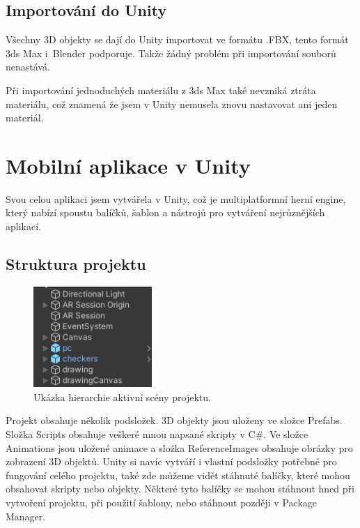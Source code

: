 \documentclass[12pt, a4paper,
twoside,        %
openright
]{report}
\let\oldchapter\chapter
\renewcommand{\chapter}{
	\clearpage
	\pagestyle{fancy}
	\oldchapter
}
\begin{document}
\section {Importování do Unity}
\label{import_do_unity}
Všechny 3D objekty se dají do Unity importovat ve formátu .FBX, tento formát 3ds Max i~Blender podporuje. Takže žádný problém při importování souborů nenastává.

Při importování jednoduchých materiálu z 3ds Max také nevzniká ztráta materiálu, což znamená že jsem v Unity nemusela znovu nastavovat ani jeden materiál. 






\chapter{Mobilní aplikace v Unity}	

Svou celou aplikaci jsem vytvářela v Unity, což je multiplatformní herní engine, který nabízí spoustu balíčků, šablon a nástrojů pro vytváření nejrůznějších aplikací.  

	\section{Struktura projektu}
\label{sec:struktura_projektu}

		\begin{figure}[h!]
	\centering 
	\includegraphics[width=0.4\textwidth]{image/hierarchy.jpg} 
	\caption{Ukázka hierarchie aktivní scény projektu.} 
	\label{fig:hierarchie} 
\end{figure}


	Projekt obsahuje několik podsložek. 
	3D objekty jsou uloženy ve složce Prefabs. Složka Scripts obsahuje veškeré mnou napsané skripty v C\#. Ve složce Animations jsou uložené animace a složka ReferenceImages obsahuje obrázky pro zobrazení 3D objektů. Unity si navíc vytváří i vlastní podsložky potřebné pro fungování celého projektu, také zde můžeme vidět stáhnuté balíčky, které mohou obsahovat skripty nebo objekty. Některé tyto balíčky se mohou stáhnout hned při vytvoření projektu, při použití šablony, nebo stáhnout později v Package Manager.
	
\end{document}
